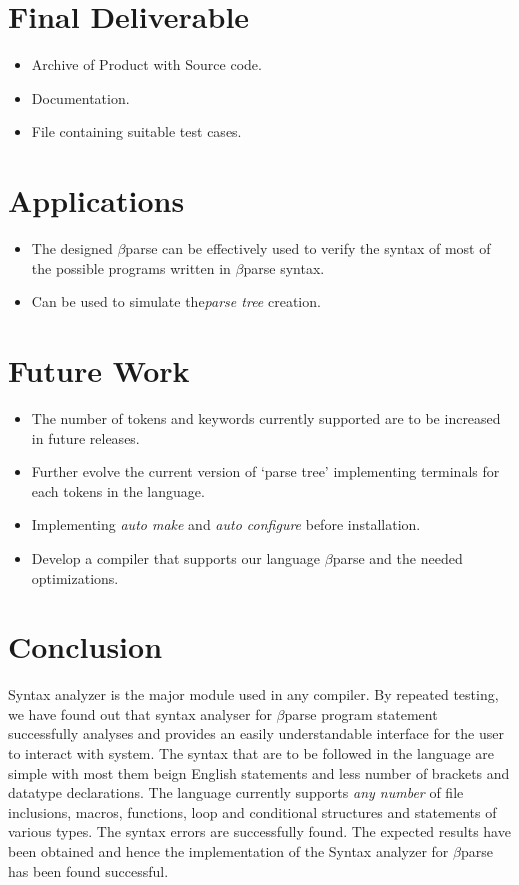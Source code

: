 \documentclass[12pt, oneside, a4paper]{article}
\begin{document}
\section{Final Deliverable}
\begin{itemize}
\item Archive of Product with Source code.
\item Documentation.
\item File containing suitable test cases.
\end{itemize}

\section{Applications}
\begin{itemize}
\item The designed $\beta$parse can be effectively used to verify the syntax of most of the possible programs written in $\beta$parse syntax.
\item Can be used to simulate the\emph{parse tree} creation.
\end{itemize}


\section{Future Work}
\begin{itemize}
\item The number of tokens and keywords currently supported are to be increased in future releases.
\item Further evolve the current version of `parse tree' implementing terminals for each tokens in the language.
\item Implementing \emph{auto make} and \emph{auto configure} before installation.
\item Develop a compiler that supports our language $\beta$parse and the needed optimizations.
\end{itemize}

\section{Conclusion}
Syntax analyzer is the major module used in any compiler. By repeated testing, we have found out that syntax analyser for $\beta$parse program statement successfully analyses and provides an easily understandable interface for the user to interact with system.  The syntax that are to be followed in the language are simple with most them beign English statements and less number of brackets and datatype declarations.  The language currently supports \emph{any number} of file inclusions, macros, functions, loop and conditional structures and statements of various types.  The syntax errors are successfully found. The expected results have been obtained and hence the implementation of the Syntax analyzer for $\beta$parse has been found successful.
\end{document}
